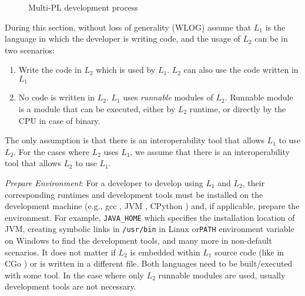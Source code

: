 \documentclass[sigplan,10pt,manuscript,nonacm]{acmart}
\begin{document}
\begin{figure}[h]
\caption{Multi-PL development process}
\label{fig:process_of_interoperability}
\end{figure}

During this section, without loss of generality (WLOG) assume that $L_1$ is the language in which the developer is writing code, and the usage of $L_2$ can be in two scenarios:
\begin{enumerate}
    \item Write the code in $L_2$ which is used by $L_1$. $L_2$ can also use the code written in $L_1$
    \item No code is written in $L_2$. $L_1$ uses \textit{runnable} modules of $L_2$. Runnable module is a module that can be executed, either by $L_2$ runtime, or directly by the CPU in case of binary.
    \end{enumerate}

The only assumption is that there is an interoperability tool that allows $L_1$ to use $L_2$. For the cases where $L_2$ uses $L_1$, we assume that there is an interoperability tool that allows $L_2$ to use $L_1$.  

\textit{Prepare Environment}: For a developer to develop using $L_1$ and $L_2$, their corresponding runtimes and development tools must be installed on the development machine (e.g., gcc \cite{gcc}, JVM \cite{jvm_specs}, CPython \cite{cpython}) and, if applicable, prepare the environment. For example, \texttt{JAVA\_HOME} which specifies the installation location of JVM, creating symbolic links in \texttt{/usr/bin} in Linux or\texttt{PATH} environment variable on Windows to find the development tools, and many more in non-default scenarios. It does not matter if $L_2$ is embedded within $L_1$ source code (like in CGo \cite{cgo_export_c}) or is written in a different file. Both languages need to be built/executed with some tool. In the case where only $L_2$ runnable modules are used, usually development tools are not necessary.
\end{document}
